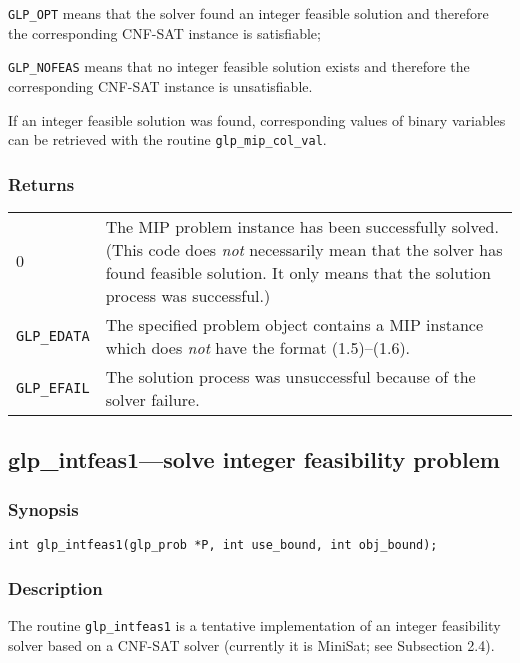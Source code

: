 \documentclass[11pt,draft]{article}
\begin{document}
\verb|GLP_OPT| means that the solver found an integer feasible
solution and therefore the corresponding CNF-SAT instance is
satisfiable;

\verb|GLP_NOFEAS| means that no integer feasible solution exists and
therefore the corresponding CNF-SAT instance is unsatisfiable.

If an integer feasible solution was found, corresponding values of
binary variables can be retrieved with the routine
\verb|glp_mip_col_val|.

\subsubsection*{Returns}

\begin{tabular}{@{}p{25mm}p{97.3mm}@{}}
0 & The MIP problem instance has been successfully solved. (This code
does {\it not} necessarily mean that the solver has found feasible
solution. It only means that the solution process was successful.)\\
\verb|GLP_EDATA| & The specified problem object contains a MIP instance
which does {\it not} have the format (1.5)--(1.6).\\
\verb|GLP_EFAIL| & The solution process was unsuccessful because of the
solver failure.\\
\end{tabular}

\newpage

\subsection{glp\_intfeas1---solve integer feasibility problem}

\subsubsection*{Synopsis}

\begin{verbatim}
int glp_intfeas1(glp_prob *P, int use_bound, int obj_bound);
\end{verbatim}

\subsubsection*{Description}

The routine \verb|glp_intfeas1| is a tentative implementation of
an integer feasibility solver based on a CNF-SAT solver (currently
it is MiniSat; see Subsection 2.4).
\end{document}

